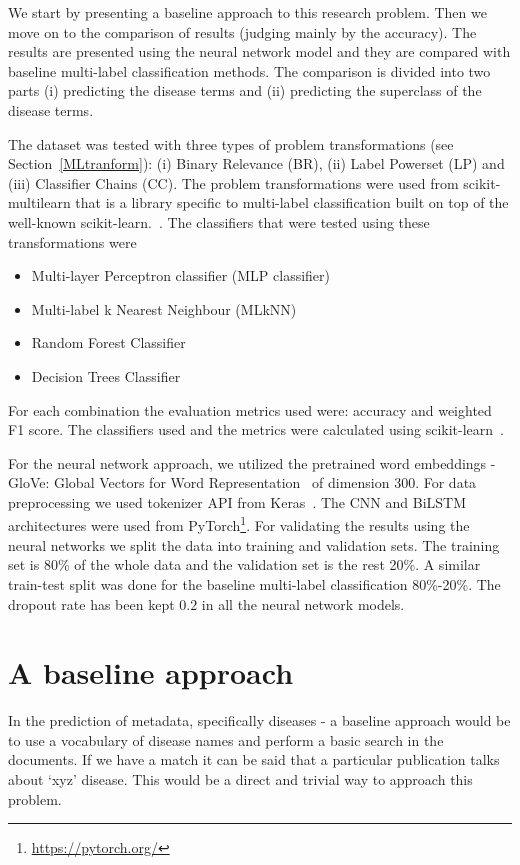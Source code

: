 We start by presenting a baseline approach to this research problem. Then we move on to the comparison of results (judging mainly by the accuracy). The results are presented using the neural network model and they are compared with baseline multi-label classification methods. The comparison is divided into two parts (i) predicting the disease terms and (ii) predicting the superclass of the disease terms.

The dataset was tested with three types of problem transformations (see Section~\ref{MLtranform}): (i) Binary Relevance (BR), (ii) Label Powerset (LP) and (iii) Classifier Chains (CC). The problem transformations were used from scikit-multilearn that is a library specific to multi-label classification built on top of the well-known scikit-learn.~\cite{2017arXiv171100046S}. The classifiers that were tested using these transformations were 
\begin{itemize}
    \item Multi-layer Perceptron classifier (MLP classifier) 
    \item Multi-label k Nearest Neighbour (MLkNN) 
    \item Random Forest Classifier 
    \item Decision Trees Classifier 
\end{itemize}
For each combination the evaluation metrics used were: accuracy and weighted F1 score. The classifiers used and the metrics were calculated using scikit-learn~\cite{scikit-learn}. 

For the neural network approach, we utilized the pretrained word embeddings - GloVe: Global Vectors for Word Representation~\cite{pennington2014glove} of dimension 300. For data preprocessing we used tokenizer API from Keras~\cite{chollet2015keras}. The CNN and BiLSTM architectures were used from PyTorch\footnote{\url{https://pytorch.org/}}.
For validating the results using the neural networks we split the data into training and validation sets. The training set is 80\% of the whole data and the validation set is the rest 20\%. A similar train-test split was done for the baseline multi-label classification 80\%-20\%. The dropout rate has been kept $0.2$ in all the neural network models. 

\section{A baseline approach}
In the prediction of metadata, specifically diseases - a baseline approach would be to use a vocabulary of disease names and perform a basic search in the documents. If we have a match it can be said that a particular publication talks about `xyz' disease. This would be a direct and trivial way to approach this problem. 

